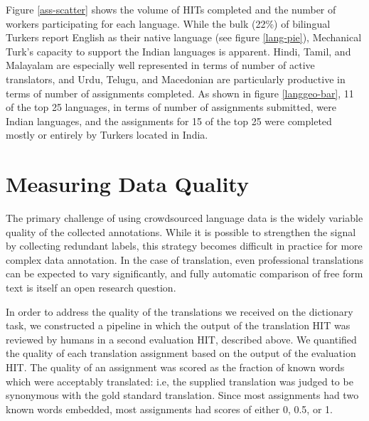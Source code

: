 \documentclass[11pt]{article}
\begin{document}
Figure \ref{ass-scatter} shows the volume of HITs completed and the number of workers participating for each language. While the bulk (22\%) of bilingual Turkers report English as their native language (see figure \ref{lang-pie}), Mechanical Turk's capacity to support the Indian languages is apparent. Hindi, Tamil, and Malayalam are especially well represented in terms of number of active translators, and Urdu, Telugu, and Macedonian are particularly productive in terms of number of assignments completed. As shown in figure \ref{langgeo-bar}, 11 of the top 25 languages, in terms of number of assignments submitted, were Indian languages, and the assignments for 15 of the top 25 were completed mostly or entirely by Turkers located in India. 




\section{Measuring Data Quality}
The primary challenge of using crowdsourced language data is the widely variable quality of the collected annotations. While it is possible to strengthen the signal by collecting redundant labels, this strategy becomes difficult in practice for more complex data annotation. In the case of translation, even professional translations can be expected to vary significantly, and fully automatic comparison of free form text is itself an open research question.

 
In order to address the quality of the translations we received on the dictionary task, we constructed a pipeline in which the output of the translation HIT was reviewed by humans in a second evaluation HIT, described above. We quantified the quality of each translation assignment based on the output of the evaluation HIT. The quality of an assignment was scored as the fraction of known words which were acceptably translated: i.e, the supplied translation was judged to be synonymous with the gold standard translation. Since most assignments had two known words embedded, most assignments had scores of either 0, 0.5, or 1.
\end{document}
